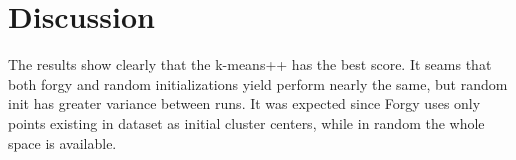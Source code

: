 \documentclass{article}
\begin{document}
\section{Discussion}

The results show clearly that the k-means++ has the best score. It seams that both forgy and random
initializations yield perform nearly the same, but random init has greater variance between runs. It was expected since Forgy uses only points existing in dataset as initial cluster centers, while in random
the whole space is available.
\end{document}
